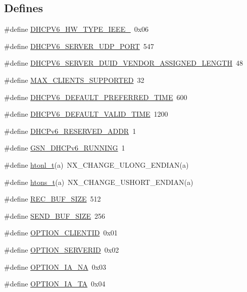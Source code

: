 \subsection*{Defines}
\begin{DoxyCompactItemize}
\item 
\#define \hyperlink{a00483_a41c5abad52342d95307159d75744be8d}{DHCPV6\_\-HW\_\-TYPE\_\-IEEE\_}~0x06
\item 
\#define \hyperlink{a00483_a756a3ed2f077dd25f79697de051bf054}{DHCPV6\_\-SERVER\_\-UDP\_\-PORT}~547
\item 
\#define \hyperlink{a00483_a3ff50f033298c268838af66368fb4e69}{DHCPV6\_\-SERVER\_\-DUID\_\-VENDOR\_\-ASSIGNED\_\-LENGTH}~48
\item 
\#define \hyperlink{a00483_a9f73551d8a5dc5848f0697423c2decd0}{MAX\_\-CLIENTS\_\-SUPPORTED}~32
\item 
\#define \hyperlink{a00483_a4fad1fc7152257309c71c4bb436b2923}{DHCPV6\_\-DEFAULT\_\-PREFERRED\_\-TIME}~600
\item 
\#define \hyperlink{a00483_aa922293cdf6f9d7eb2565637343cc792}{DHCPV6\_\-DEFAULT\_\-VALID\_\-TIME}~1200
\item 
\#define \hyperlink{a00483_ada7a6a6dd1f42862da0d21c0c8e7ed28}{DHCPv6\_\-RESERVED\_\-ADDR}~1
\item 
\#define \hyperlink{a00483_a54d11cb48ed95c18bf82f06bd6a011d4}{GSN\_\-DHCPv6\_\-RUNNING}~1
\item 
\#define \hyperlink{a00483_a50c99b3c3347b1c54841c401a73f9b5a}{htonl\_\-t}(a)~NX\_\-CHANGE\_\-ULONG\_\-ENDIAN(a)
\item 
\#define \hyperlink{a00483_a0594815223be09a511e2c5a604eef26b}{htons\_\-t}(a)~NX\_\-CHANGE\_\-USHORT\_\-ENDIAN(a)
\item 
\#define \hyperlink{a00483_ab05acc32c9a175a532474a854e89595d}{REC\_\-BUF\_\-SIZE}~512
\item 
\#define \hyperlink{a00483_a4c6ddff94506616bb52409dfd2af1d0c}{SEND\_\-BUF\_\-SIZE}~256
\item 
\#define \hyperlink{a00483_af50ac01a495c2a42d607618c1b326169}{OPTION\_\-CLIENTID}~0x01
\item 
\#define \hyperlink{a00483_a05aee2eeda94c9918d3e3baa9ad941b5}{OPTION\_\-SERVERID}~0x02
\item 
\#define \hyperlink{a00483_afe5b550dba54955b26ecaba13992ff6b}{OPTION\_\-IA\_\-NA}~0x03
\item 
\#define \hyperlink{a00483_a9deb61f575a66b7b36e928f55777cfdd}{OPTION\_\-IA\_\-TA}~0x04
\item 

\end{DoxyCompactItemize}
